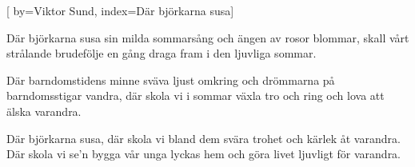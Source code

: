 


[ 	%
	by={Viktor Sund},	%
	index={Där björkarna susa}]		%
	
\beginverse*		%
Där björkarna susa sin milda sommarsång
och ängen av rosor blommar,
skall vårt strålande brudefölje en gång
draga fram i den ljuvliga sommar.
\endverse			%

\beginverse*		%
Där barndomstidens
minne sväva ljust omkring
och drömmarna på barndomsstigar vandra,
där skola vi i sommar växla tro och ring
och lova att älska varandra.
\endverse			%

\beginverse*		%
Där björkarna susa, där skola vi bland dem
svära trohet och kärlek åt varandra.
Där skola vi se'n bygga vår
unga lyckas hem
och göra livet ljuvligt för varandra.
\endverse			%
\endsong			%
